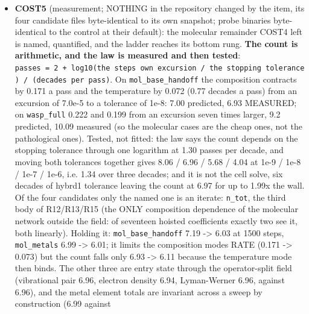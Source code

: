 \documentclass[english,a4paper]{my_memo}
\begin{document}
\begin{itemize}
  with it the H2 vibrational quench fraction and bound energy. Also
  recorded: \texttt{xuv\_field\_block\_cells} and \texttt{xuv\_self\_field\_passes} are
  compile-time parameters, so measuring the two together needs a rebuild;
  \texttt{heating\_of\_composition} calls \texttt{he\_rec\_coupling} a second time whole-grid
  every pass for its heating alone (both calls together bounded at 1.7
  percent of wall); on \texttt{mol\_base\_handoff} the He recombination coupling is
  what keeps step 0 inside the pass cap.
\item
  \textbf{COST5} (measurement; NOTHING in the repository changed by the item, its
  four candidate files byte-identical to its own snapshot; probe binaries
  byte-identical to the control at their default): the molecular remainder
  COST4 left is named, quantified, and the ladder reaches its bottom rung.
  \textbf{The count is arithmetic, and the law is measured and then tested}:
  \texttt{passes\ =\ 2\ +\ log10(the\ step\textquotesingle{}s\ own\ excursion\ /\ the\ stopping\ tolerance)\ /\ (decades\ per\ pass)}. On \texttt{mol\_base\_handoff} the composition contracts by
  0.171 a pass and the temperature by 0.072 (0.77 decades a pass) from an
  excursion of 7.0e-5 to a tolerance of 1e-8: 7.00 predicted, 6.93 MEASURED;
  on \texttt{wasp\_full} 0.222 and 0.199 from an excursion seven times larger, 9.2
  predicted, 10.09 measured (so the molecular cases are the cheap ones, not
  the pathological ones). Tested, not fitted: the law says the count depends
  on the stopping tolerance through one logarithm at 1.30 passes per decade,
  and moving both tolerances together gives 8.06 / 6.96 / 5.68 / 4.04 at
  1e-9 / 1e-8 / 1e-7 / 1e-6, i.e. 1.34 over three decades; and it is not the
  cell solve, six decades of hybrd1 tolerance leaving the count at 6.97 for
  up to 1.99x the wall. Of the four candidates only the named one is an
  iterate: \texttt{n\_tot}, the third body of R12/R13/R15 (the ONLY composition
  dependence of the molecular network outside the field: of seventeen
  hoisted coefficients exactly two see it, both linearly). Holding it:
  \texttt{mol\_base\_handoff} 7.19 -\textgreater{} 6.03 at 1500 steps, \texttt{mol\_metals} 6.99 -\textgreater{} 6.01;
  it limits the composition mode\textquotesingle s RATE (0.171 -\textgreater{} 0.073) but the count falls
  only 6.93 -\textgreater{} 6.11 because the temperature mode then binds. The other three
  are entry state through the operator-split field (vibrational pair 6.96,
  electron density 6.94, Lyman-Werner 6.96, against 6.96), and the metal
  element totals are invariant across a sweep by construction (6.99 against

\end{itemize}
\end{document}
